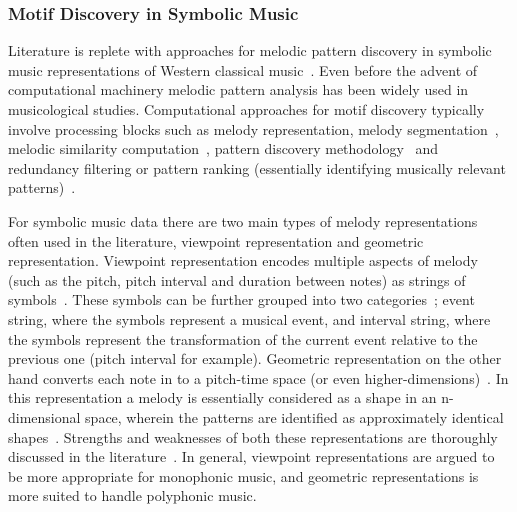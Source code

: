 \subsubsection{Motif Discovery in Symbolic Music}
\label{sec:motif_in_symbolic_music}

Literature is replete with approaches for melodic pattern discovery in symbolic music representations of Western classical music~\citep{cambouropoulos1997towards,meredith2006point,conklin2001representation,Lartillot2005b}. Even before the advent of computational machinery melodic pattern analysis has been widely used in musicological studies. Computational approaches for motif discovery typically involve processing blocks such as melody representation\citep{meredith2006point}, melody segmentation~\citep{Cambouropoulos2006}, melodic similarity computation~\citep{Cambouropoulos2001,Marsden2012}, pattern discovery methodology~\citep{collins2013siarct,meredith2002algorithms} and redundancy filtering or pattern ranking (essentially identifying musically relevant patterns)~\citep{Lartillot2005,conklin2010discovery}. 

For symbolic music data there are two main types of melody representations often used in the literature, viewpoint representation and geometric representation. Viewpoint representation encodes multiple aspects of melody (such as the pitch, pitch interval and duration between notes) as strings of symbols~\citep{conklin2001representation,conklin1995multiple}. These symbols can be further grouped into two categories~\citep{meredith2002algorithms}; event string, where the symbols represent a musical event, and interval string, where the symbols represent the transformation of the current event relative to the previous one (pitch interval for example). Geometric representation on the other hand converts each note in to a pitch-time space (or even higher-dimensions)~\citep{meredith2002algorithms}. In this representation a melody is essentially considered as a shape in an n-dimensional space, wherein the patterns are identified as approximately identical shapes~\citep{meredith2002algorithms}. Strengths and weaknesses of both these representations are thoroughly discussed in the literature~\citep{Cambouropoulos2009,meredith2002algorithms}. In general, viewpoint representations are argued to be more appropriate for monophonic music, and geometric representations is more suited to handle polyphonic music. 


